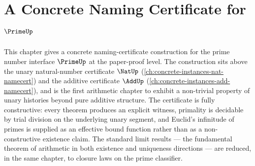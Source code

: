 \chapter{A Concrete Naming Certificate for \(\PrimeUp\)}
\label{ch:concrete-instances-prime-namecert}

This chapter gives a concrete naming-certificate construction for the prime number interface \(\PrimeUp\) at the paper-proof level. The construction sits above the unary natural-number certificate \(\NatUp\) (\autoref{ch:concrete-instances-nat-namecert}) and the additive certificate \(\AddUp\) (\autoref{ch:concrete-instances-add-namecert}), and is the first arithmetic chapter to exhibit a non-trivial property of unary histories beyond pure additive structure. The certificate is fully constructive: every theorem produces an explicit witness, primality is decidable by trial division on the underlying unary segment, and Euclid's infinitude of primes is supplied as an effective bound function rather than as a non-constructive existence claim. The standard limit results --- the fundamental theorem of arithmetic in both existence and uniqueness directions --- are reduced, in the same chapter, to closure laws on the prime classifier.










